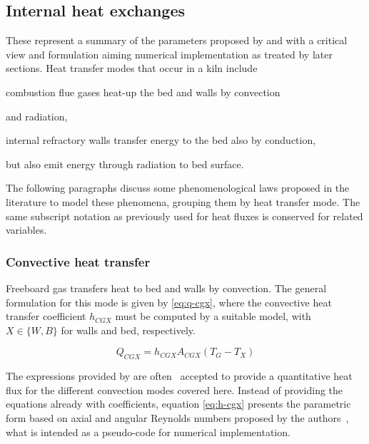 \documentclass[11pt]{paper}
\begin{document}
\subsection{Internal heat exchanges}

These represent a summary of the parameters proposed by \textcite{Mujumdar2006i} and \textcite{Hanein2017} with a critical view and formulation aiming numerical implementation as treated by later sections. Heat transfer modes that occur in a kiln include \begin{inparaenum}[(i)]
    \item combustion flue gases heat-up the bed and walls by convection
    \item and radiation,
    \item internal refractory walls transfer energy to the bed also by conduction,
    \item but also emit energy through radiation to bed surface.
\end{inparaenum} The following paragraphs discuss some phenomenological laws proposed in the literature to model these phenomena, grouping them by heat transfer mode. The same subscript notation as previously used for heat fluxes is conserved for related variables.

\subsubsection*{Convective heat transfer}

Freeboard gas transfers heat to bed and walls by convection. The general formulation for this mode is given by \eqref{eq:q-cgx}, where the convective heat transfer coefficient $h_{CGX}$ must be computed by a suitable model, with $X\in\{W,B\}$ for walls and bed, respectively.

\begin{equation}
Q_{CGX} = h _{CGX}A_{CGX}\left(T_{G}-T_{X}\right)
\label{eq:q-cgx}
\end{equation}

The expressions provided by \textcite{Tscheng1979} are often~\cite{Mujumdar2006i,Hanein2017} accepted to provide a quantitative heat flux for the different convection modes covered here. Instead of providing the equations already with coefficients, equation \eqref{eq:h-cgx} presents the parametric form based on axial and angular Reynolds numbers proposed by the authors~\cite{Tscheng1979}, what is intended as a pseudo-code for numerical implementation.
\end{document}
